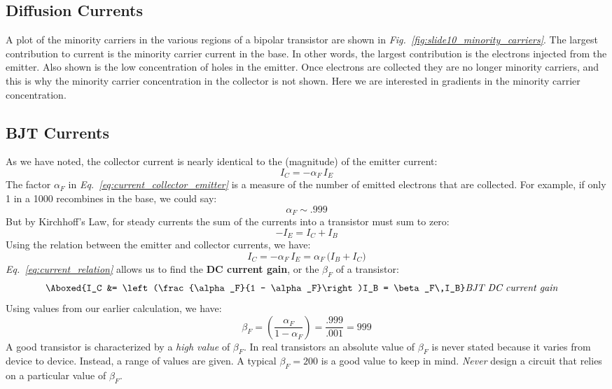 \subsection{Diffusion Currents}
A plot of the minority carriers in the various regions of a bipolar transistor are shown in \emph{Fig.~\ref{fig:slide10_minority_carriers}}.  The largest contribution to current is the minority carrier current in the base.  In other words, the largest contribution is the electrons injected from the emitter.  Also shown is the low concentration of holes in the emitter.  Once electrons are collected they are no longer minority carriers, and this is why the minority carrier concentration in the collector is not shown.  Here we are interested in gradients in the minority carrier concentration.
\subsection{BJT Currents}
As we have noted, the collector current is nearly identical to the (magnitude) of the emitter current:
    \begin{equation}
        I_C = -\alpha_F\,I_E
        \label{eq:current_collector_emitter}
    \end{equation}
The factor $\alpha_F$ in \emph{Eq.~\ref{eq:current_collector_emitter}} is a measure of the number of emitted electrons that are collected.  For example, if only 1 in a 1000 recombines in the base, we could say:
    \begin{equation}
        \alpha _F \sim .999
    \end{equation}
But by Kirchhoff's Law, for steady currents the sum of the currents into a transistor must sum to zero:
    \begin{equation} 
        -I_E = I_C + I_B
    \end{equation}
Using the relation between the emitter and collector currents, we have:
    \begin{equation}
        I_C = -\alpha_F\,I_E = \alpha_F\,\big(I_B + I_C\big)
        \label{eq:current_relation}
    \end{equation}
\emph{Eq.~\ref{eq:current_relation}} allows us to find the \textbf{DC current gain}, or the $\beta_F$ of a transistor:
    \begin{align}
        \Aboxed{I_C &= \left(\frac{\alpha_F}{1 - \alpha_F}\right)I_B = \beta_F\,I_B} &\textit{BJT DC current gain}
    \end{align}
Using values from our earlier calculation, we have:
    \begin{equation}
        \beta_F = \left(\frac{\alpha_F}{1 - \alpha_F}\right) = \frac{.999}{.001} = 999
    \end{equation}
A good transistor is characterized by a \textit{high value} of $\beta_F$.  In real transistors an absolute value of $\beta_F$ is never stated because it varies from device to device.  Instead, a range of values are given.  A typical $\beta_F =200$ is a good value to keep in mind. \emph{Never} design a circuit that relies on a particular value of $\beta_F$.  


